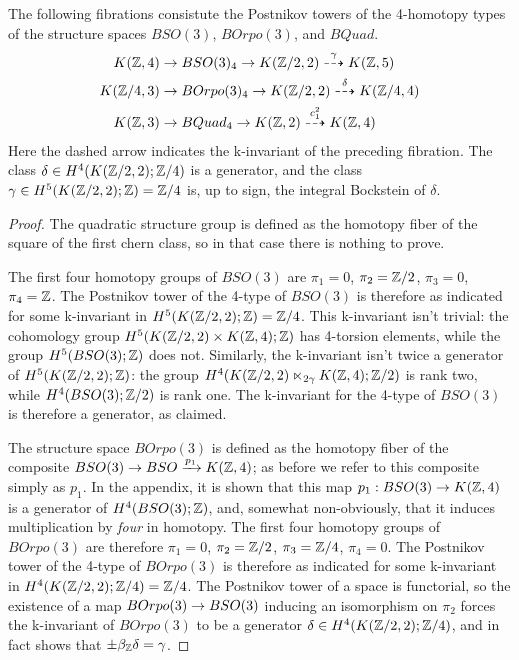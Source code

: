 \documentclass{amsart}
\begin{document}
\begin{proposition}
The following fibrations consistute the Postnikov towers of the 4-homotopy types of the structure spaces $BSO(3)$, $BOrpo(3)$, and $BQuad$.
\begin{align}
K(\mathbb Z,4) \rightarrow & \; BSO(3)_4 \rightarrow K(\mathbb Z/2,2) \overset{\gamma}{\dashrightarrow} K(\mathbb Z,5) \nonumber \\
K(\mathbb Z/4,3) \rightarrow & \; BOrpo(3)_4 \rightarrow K(\mathbb Z/2,2) \overset{\delta}{\dashrightarrow} K(\mathbb Z/4,4) \nonumber \\
K(\mathbb Z,3) \rightarrow & \; BQuad_4 \rightarrow K(\mathbb Z,2) \overset{c_1^2}{\dashrightarrow} K(\mathbb Z,4) \nonumber
\end{align}
\nid Here the dashed arrow indicates the k-invariant of the preceding fibration.  The class $\delta \in H^4(K(\mathbb Z/2,2);\mathbb Z/4)$ is a generator, and the class $\gamma \in H^5(K(\mathbb Z/2,2);\mathbb Z) = \mathbb Z/4$ is, up to sign, the integral Bockstein of $\delta$. %
\end{proposition}

\begin{proof}
The quadratic structure group is defined as the homotopy fiber of the square of the first chern class, so in that case there is nothing to prove.

The first four homotopy groups of $BSO(3)$ are $\pi_1 = 0$, $\pi_2 = \mathbb Z/2$, $\pi_3 = 0$, $\pi_4 = \mathbb Z$.  The Postnikov tower of the 4-type of $BSO(3)$ is therefore as indicated for some k-invariant in $H^5(K(\mathbb Z/2,2);\mathbb Z) = \mathbb Z/4$.  This k-invariant isn't trivial: the cohomology group $H^5(K(\mathbb Z/2,2) \times K(\mathbb Z,4);\mathbb Z)$ has 4-torsion elements, while the group $H^5(BSO(3);\mathbb Z)$ does not.  Similarly, the k-invariant isn't twice a generator of $H^5(K(\mathbb Z/2,2);\mathbb Z)$: the group $H^4(K(\mathbb Z/2,2) \ltimes_{2\gamma} K(\mathbb Z,4);\mathbb Z/2)$ is rank two, while $H^4(BSO(3);\mathbb Z/2)$ is rank one.  The k-invariant for the 4-type of $BSO(3)$ is therefore a generator, as claimed. 

The structure space $BOrpo(3)$ is defined as the homotopy fiber of the composite $BSO(3) \rightarrow BSO \xrightarrow{p_1} K(\mathbb Z,4)$; as before we refer to this composite simply as $p_1$.  In the appendix, it is shown that this map $p_1: BSO(3) \rightarrow K(\mathbb Z,4)$ is a generator of $H^4(BSO(3);\mathbb Z)$, and, somewhat non-obviously, that it induces multiplication by \emph{four} in homotopy.  The first four homotopy groups of $BOrpo(3)$ are therefore $\pi_1 = 0$, $\pi_2 = \mathbb Z/2$, $\pi_3 = \mathbb Z/4$, $\pi_4 = 0$.  The Postnikov tower of the 4-type of $BOrpo(3)$ is therefore as indicated for some k-invariant in $H^4(K(\mathbb Z/2,2);\mathbb Z/4) = \mathbb Z/4$.  The Postnikov tower of a space is functorial, so the existence of a map $BOrpo(3) \rightarrow BSO(3)$ inducing an isomorphism on $\pi_2$ forces the k-invariant of $BOrpo(3)$ to be a generator $\delta \in H^4(K(\mathbb Z/2,2);\mathbb Z/4)$, and in fact shows that $\pm \beta_{\mathbb Z} \delta = \gamma$. 
\end{proof}
\end{document}
